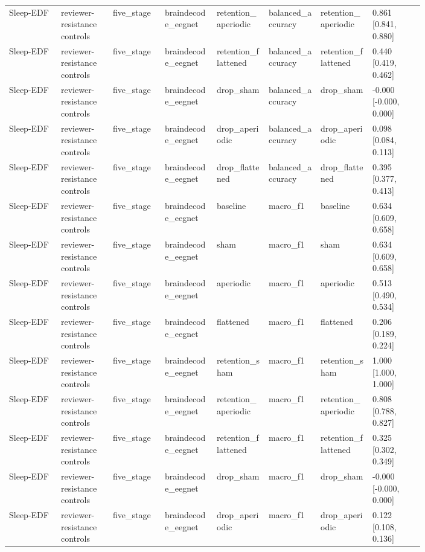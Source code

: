\begin{longtable}{p{0.10\linewidth}p{0.10\linewidth}p{0.10\linewidth}p{0.10\linewidth}p{0.10\linewidth}p{0.10\linewidth}p{0.10\linewidth}p{0.10\linewidth}}
Sleep-EDF & reviewer-resistance controls & five\_stage & braindecode\_eegnet & retention\_aperiodic & balanced\_accuracy & retention\_aperiodic & 0.861 [0.841, 0.880]\\
Sleep-EDF & reviewer-resistance controls & five\_stage & braindecode\_eegnet & retention\_flattened & balanced\_accuracy & retention\_flattened & 0.440 [0.419, 0.462]\\
Sleep-EDF & reviewer-resistance controls & five\_stage & braindecode\_eegnet & drop\_sham & balanced\_accuracy & drop\_sham & -0.000 [-0.000, 0.000]\\
Sleep-EDF & reviewer-resistance controls & five\_stage & braindecode\_eegnet & drop\_aperiodic & balanced\_accuracy & drop\_aperiodic & 0.098 [0.084, 0.113]\\
Sleep-EDF & reviewer-resistance controls & five\_stage & braindecode\_eegnet & drop\_flattened & balanced\_accuracy & drop\_flattened & 0.395 [0.377, 0.413]\\
Sleep-EDF & reviewer-resistance controls & five\_stage & braindecode\_eegnet & baseline & macro\_f1 & baseline & 0.634 [0.609, 0.658]\\
Sleep-EDF & reviewer-resistance controls & five\_stage & braindecode\_eegnet & sham & macro\_f1 & sham & 0.634 [0.609, 0.658]\\
Sleep-EDF & reviewer-resistance controls & five\_stage & braindecode\_eegnet & aperiodic & macro\_f1 & aperiodic & 0.513 [0.490, 0.534]\\
Sleep-EDF & reviewer-resistance controls & five\_stage & braindecode\_eegnet & flattened & macro\_f1 & flattened & 0.206 [0.189, 0.224]\\
Sleep-EDF & reviewer-resistance controls & five\_stage & braindecode\_eegnet & retention\_sham & macro\_f1 & retention\_sham & 1.000 [1.000, 1.000]\\
Sleep-EDF & reviewer-resistance controls & five\_stage & braindecode\_eegnet & retention\_aperiodic & macro\_f1 & retention\_aperiodic & 0.808 [0.788, 0.827]\\
Sleep-EDF & reviewer-resistance controls & five\_stage & braindecode\_eegnet & retention\_flattened & macro\_f1 & retention\_flattened & 0.325 [0.302, 0.349]\\
Sleep-EDF & reviewer-resistance controls & five\_stage & braindecode\_eegnet & drop\_sham & macro\_f1 & drop\_sham & -0.000 [-0.000, 0.000]\\
Sleep-EDF & reviewer-resistance controls & five\_stage & braindecode\_eegnet & drop\_aperiodic & macro\_f1 & drop\_aperiodic & 0.122 [0.108, 0.136]\\

\end{longtable}

